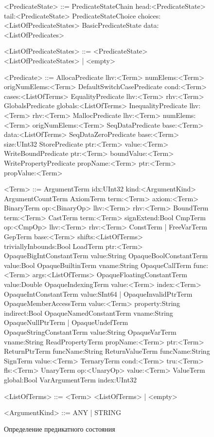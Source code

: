 \begin{figure}
    \begin{grammar}
    \scriptsize
    <PredicateState> ::= PredicateStateChain head:<PredicateState> 
    tail:<PredicateState>
    \alt PredicateStateChoice choices:<ListOfPredicateStates>
    \alt BasicPredicateState data:<ListOfPredicates>

    <ListOfPredicateStates> ::= <PredicateState> <ListOfPredicateStates> | 
    <empty>

    <Predicate> ::= AllocaPredicate lhv:<Term> numElems:<Term> 
    origNumElems:<Term>
    \alt DefaultSwitchCasePredicate cond:<Term> cases:<ListOfTerms>
    \alt EqualityPredicate lhv:<Term> rhv:<Term>
    \alt GlobalsPredicate globals:<ListOfTerms>
    \alt InequalityPredicate lhv:<Term> rhv:<Term>
    \alt MallocPredicate lhv:<Term> numElems:<Term> origNumElems:<Term>
    \alt SeqDataPredicate base:<Term> data:<ListOfTerms>
    \alt SeqDataZeroPredicate base:<Term> size:UInt32
    \alt StorePredicate ptr:<Term> value:<Term>
    \alt WriteBoundPredicate ptr:<Term> boundValue:<Term>
    \alt WritePropertyPredicate propName:<Term> ptr:<Term> propValue:<Term>
    
    <Term> ::= ArgumentTerm idx:UInt32 kind:<ArgumentKind>
    \alt ArgumentCountTerm
    \alt AxiomTerm term:<Term> axiom:<Term>
    \alt BinaryTerm op:<BinaryOp> lhv:<Term> rhv:<Term>
    \alt BoundTerm term:<Term>
    \alt CastTerm term:<Term> signExtend:Bool
    \alt CmpTerm op:<CmpOp> lhv:<Term> rhv:<Term>
    \alt ConstTerm | FreeVarTerm
    \alt GepTerm base:<Term> shifts:<ListOfTerms> triviallyInbounds:Bool
    \alt LoadTerm ptr:<Term>
    \alt OpaqueBigIntConstantTerm value:String
    \alt OpaqueBoolConstantTerm value:Bool
    \alt OpaqueBuiltinTerm vname:String
    \alt OpaqueCallTerm func:<Term> args:<ListOfTerms>
    \alt OpaqueFloatingConstantTerm value:Double
    \alt OpaqueIndexingTerm value:<Term> index:<Term>
    \alt OpaqueIntConstantTerm value:SInt64 | OpaqueInvalidPtrTerm
    \alt OpaqueMemberAccessTerm value:<Term> property:String indirect:Bool
    \alt OpaqueNamedConstantTerm vname:String
    \alt OpaqueNullPtrTerm | OpaqueUndefTerm 
    \alt OpaqueStringConstantTerm value:String
    \alt OpaqueVarTerm vname:String
    \alt ReadPropertyTerm propName:<Term> ptr:<Term>
    \alt ReturnPtrTerm funcName:String
    \alt ReturnValueTerm funcName:String
    \alt SignTerm value:<Term>
    \alt TernaryTerm cond:<Term> tru:<Term> fls:<Term>
    \alt UnaryTerm op:<UnaryOp> value:<Term>
    \alt ValueTerm global:Bool
    \alt VarArgumentTerm index:UInt32

    <ListOfTerms> ::= <Term> <ListOfTerms> | <empty>

    <ArgumentKind> ::= ANY | STRING
    \end{grammar}
    
\caption{Определение предикатного состояния}
\label{image:predicateStateDefinition}
\end{figure}

